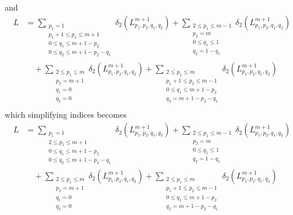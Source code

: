 \documentclass[11pt]{article}
\theoremstyle{definition}
\theoremstyle{definition}
\theoremstyle{plain}
\theoremstyle{plain}
\theoremstyle{plain}
\theoremstyle{definition}
\begin{document}
and
\begin{align*}
L &= \sum\limits_{\substack{p_1=1 \\ p_1+1\leq p_1\leq m+1 \\ 0\leq q_1 \leq m+1-p_2 \\ 0\leq q_2 \leq m+1-p_2-q_1}}\delta_2\left(L^{m+1}_{p_1,p_2,q_1,q_2}\right) + \sum\limits_{\substack{2\leq p_1 \leq m-1 \\ p_2 = m \\ 0 \leq q_1 \leq 1 \\ q_2 = 1 - q_1}}\delta_2\left(L^{m+1}_{p_1,p_2,q_1,q_2}\right) \\
&\quad + \sum\limits_{\substack{2\leq p_1 \leq m \\ p_2 = m+1 \\ q_1 = 0 \\ q_2 = 0}}\delta_2\left(L^{m+1}_{p_1,p_2,q_1,q_2}\right) + \sum\limits_{\substack{2\leq p_1\leq m \\ p_1+1\leq p_2\leq m-1 \\ 0\leq q_1 \leq m+1-p_2 \\ q_2 = m+1-p_2-q_1}}\delta_2\left(L^{m+1}_{p_1,p_2,q_1,q_2}\right) \\
\end{align*}
which simplifying indices becomes
\begin{align*}
L &= \sum\limits_{\substack{p_1=1 \\ 2\leq p_1\leq m+1 \\ 0\leq q_1 \leq m+1-p_2 \\ 0\leq q_2 \leq m+1-p_2-q_1}}\delta_2\left(L^{m+1}_{p_1,p_2,q_1,q_2}\right) + \sum\limits_{\substack{2\leq p_1 \leq m-1 \\ p_2 = m \\ 0 \leq q_1 \leq 1 \\ q_2 = 1 - q_1}}\delta_2\left(L^{m+1}_{p_1,p_2,q_1,q_2}\right) \\
&\quad + \sum\limits_{\substack{2\leq p_1 \leq m \\ p_2 = m+1 \\ q_1 = 0 \\ q_2 = 0}}\delta_2\left(L^{m+1}_{p_1,p_2,q_1,q_2}\right) + \sum\limits_{\substack{2\leq p_1\leq m \\ p_1+1\leq p_2\leq m-1 \\ 0\leq q_1 \leq m+1-p_2 \\ q_2 = m+1-p_2-q_1}}\delta_2\left(L^{m+1}_{p_1,p_2,q_1,q_2}\right) \\
\end{align*}
\end{document}
